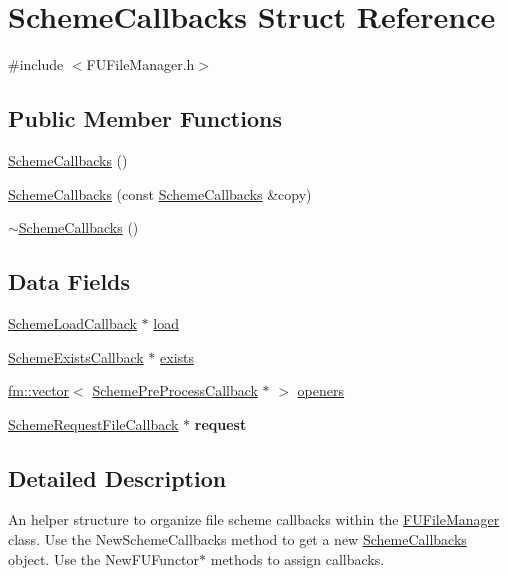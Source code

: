 \hypertarget{structSchemeCallbacks}{
\section{SchemeCallbacks Struct Reference}
\label{structSchemeCallbacks}
}


{\ttfamily \#include $<$FUFileManager.h$>$}

\subsection*{Public Member Functions}
\begin{DoxyCompactItemize}
\item 
\hyperlink{structSchemeCallbacks_a8e9f849699d95b56dbde1f4d6b271c99}{SchemeCallbacks} ()
\item 
\hyperlink{structSchemeCallbacks_a46208c6716725d91bed6290494dc46bb}{SchemeCallbacks} (const \hyperlink{structSchemeCallbacks}{SchemeCallbacks} \&copy)
\item 
\hyperlink{structSchemeCallbacks_a47c17b3bc1014f2e70ef1e968658c9b5}{$\sim$SchemeCallbacks} ()
\end{DoxyCompactItemize}
\subsection*{Data Fields}
\begin{DoxyCompactItemize}
\item 
\hyperlink{classIFunctor1}{SchemeLoadCallback} $\ast$ \hyperlink{structSchemeCallbacks_abb6b2030a834466fc6f3673916ad8f59}{load}
\item 
\hyperlink{classIFunctor1}{SchemeExistsCallback} $\ast$ \hyperlink{structSchemeCallbacks_a911c7c4e197a9fbe00364e1f0bf20200}{exists}
\item 
\hyperlink{classfm_1_1vector}{fm::vector}$<$ \hyperlink{classIFunctor2}{SchemePreProcessCallback} $\ast$ $>$ \hyperlink{structSchemeCallbacks_a8cb30bfc775cd2611484f995fdcff798}{openers}
\item 
\hypertarget{structSchemeCallbacks_a4bc471c34c3da29f43453d88106e6797}{
\hyperlink{classIFunctor3}{SchemeRequestFileCallback} $\ast$ {\bfseries request}}
\label{structSchemeCallbacks_a4bc471c34c3da29f43453d88106e6797}

\end{DoxyCompactItemize}


\subsection{Detailed Description}
An helper structure to organize file scheme callbacks within the \hyperlink{classFUFileManager}{FUFileManager} class. Use the NewSchemeCallbacks method to get a new \hyperlink{structSchemeCallbacks}{SchemeCallbacks} object. Use the NewFUFunctor$\ast$ methods to assign callbacks. 

